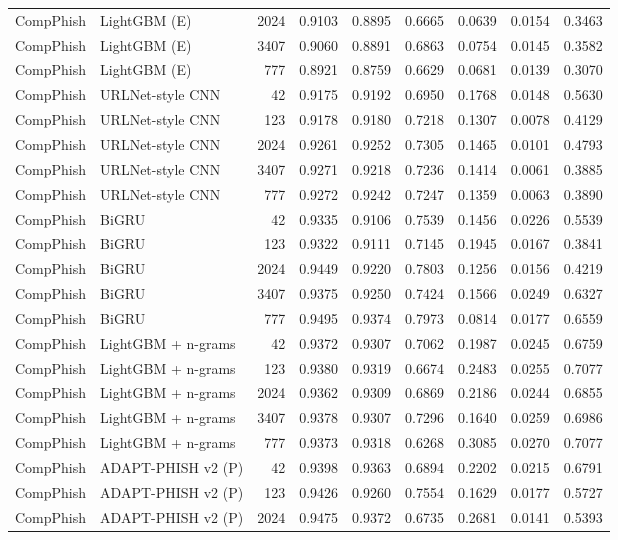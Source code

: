 \begin{table}[t]
\begin{tabular}{llrrrrrrr}
CompPhish & LightGBM (E) & 2024 & 0.9103 & 0.8895 & 0.6665 & 0.0639 & 0.0154 & 0.3463 \\
CompPhish & LightGBM (E) & 3407 & 0.9060 & 0.8891 & 0.6863 & 0.0754 & 0.0145 & 0.3582 \\
CompPhish & LightGBM (E) & 777 & 0.8921 & 0.8759 & 0.6629 & 0.0681 & 0.0139 & 0.3070 \\
CompPhish & URLNet-style CNN & 42 & 0.9175 & 0.9192 & 0.6950 & 0.1768 & 0.0148 & 0.5630 \\
CompPhish & URLNet-style CNN & 123 & 0.9178 & 0.9180 & 0.7218 & 0.1307 & 0.0078 & 0.4129 \\
CompPhish & URLNet-style CNN & 2024 & 0.9261 & 0.9252 & 0.7305 & 0.1465 & 0.0101 & 0.4793 \\
CompPhish & URLNet-style CNN & 3407 & 0.9271 & 0.9218 & 0.7236 & 0.1414 & 0.0061 & 0.3885 \\
CompPhish & URLNet-style CNN & 777 & 0.9272 & 0.9242 & 0.7247 & 0.1359 & 0.0063 & 0.3890 \\
CompPhish & BiGRU & 42 & 0.9335 & 0.9106 & 0.7539 & 0.1456 & 0.0226 & 0.5539 \\
CompPhish & BiGRU & 123 & 0.9322 & 0.9111 & 0.7145 & 0.1945 & 0.0167 & 0.3841 \\
CompPhish & BiGRU & 2024 & 0.9449 & 0.9220 & 0.7803 & 0.1256 & 0.0156 & 0.4219 \\
CompPhish & BiGRU & 3407 & 0.9375 & 0.9250 & 0.7424 & 0.1566 & 0.0249 & 0.6327 \\
CompPhish & BiGRU & 777 & 0.9495 & 0.9374 & 0.7973 & 0.0814 & 0.0177 & 0.6559 \\
CompPhish & LightGBM + n-grams & 42 & 0.9372 & 0.9307 & 0.7062 & 0.1987 & 0.0245 & 0.6759 \\
CompPhish & LightGBM + n-grams & 123 & 0.9380 & 0.9319 & 0.6674 & 0.2483 & 0.0255 & 0.7077 \\
CompPhish & LightGBM + n-grams & 2024 & 0.9362 & 0.9309 & 0.6869 & 0.2186 & 0.0244 & 0.6855 \\
CompPhish & LightGBM + n-grams & 3407 & 0.9378 & 0.9307 & 0.7296 & 0.1640 & 0.0259 & 0.6986 \\
CompPhish & LightGBM + n-grams & 777 & 0.9373 & 0.9318 & 0.6268 & 0.3085 & 0.0270 & 0.7077 \\
CompPhish & ADAPT-PHISH v2 (P) & 42 & 0.9398 & 0.9363 & 0.6894 & 0.2202 & 0.0215 & 0.6791 \\
CompPhish & ADAPT-PHISH v2 (P) & 123 & 0.9426 & 0.9260 & 0.7554 & 0.1629 & 0.0177 & 0.5727 \\
CompPhish & ADAPT-PHISH v2 (P) & 2024 & 0.9475 & 0.9372 & 0.6735 & 0.2681 & 0.0141 & 0.5393 \\

\end{tabular}
\end{table}
